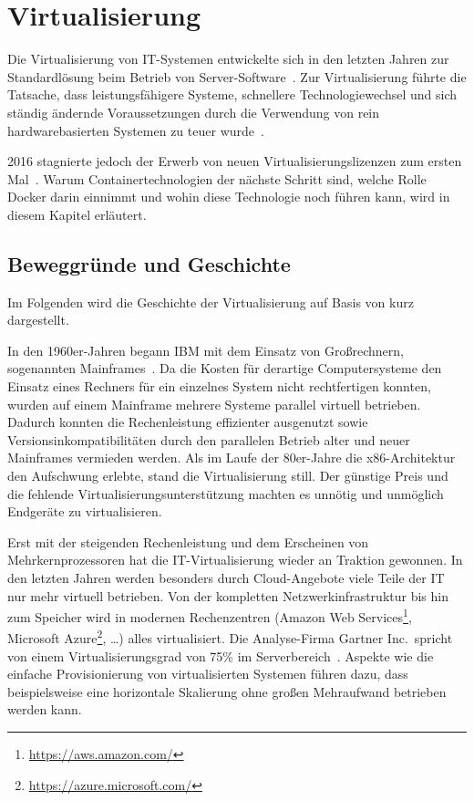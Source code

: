 \chapter{Virtualisierung}
\label{cha:virtualisierung}
Die Virtualisierung von IT-Systemen entwickelte sich in den letzten Jahren zur Standardlösung beim Betrieb von Server-Software~\autocite{Gartner-Magic-Quadrant2016:online}.
Zur Virtualisierung führte die Tatsache, dass leistungsfähigere Systeme, schnellere Technologiewechsel und sich ständig ändernde Voraussetzungen durch die Verwendung von rein hardwarebasierten Systemen zu teuer wurde~\autocite{vmware-virtualization-history:online}.

2016 stagnierte jedoch der Erwerb von neuen Virtualisierungslizenzen zum ersten Mal~\autocite{Gartner-Magic-Quadrant2016:online}.
Warum Containertechnologien der nächste Schritt sind, welche Rolle Docker darin einnimmt und wohin diese Technologie noch führen kann, wird in diesem Kapitel erläutert.
\section{Beweggründe und Geschichte}
\label{sec:virtualisierungsgeschichte}
Im Folgenden wird die Geschichte der Virtualisierung auf Basis von \autocite{Baun2009} kurz dargestellt.

In den 1960er-Jahren begann IBM mit dem Einsatz von Großrechnern, sogenannten Mainframes~\autocite{IBM1981}.
Da die Kosten für derartige Computersysteme den Einsatz eines Rechners für ein einzelnes System nicht rechtfertigen konnten, wurden auf einem Main\-frame mehrere Systeme parallel virtuell betrieben.
Dadurch konnten die Rechenleistung effizienter ausgenutzt sowie Versionsinkompatibilitäten durch den parallelen Betrieb alter und neuer Main\-frames vermieden werden.
Als im Laufe der 80er-Jahre die x86-Architektur den Aufschwung erlebte, stand die Virtualisierung still.
Der günstige Preis und die fehlende Virtualisierungsunterstützung machten es unnötig und unmöglich Endgeräte zu virtualisieren.

Erst mit der steigenden Rechenleistung und dem Erscheinen von Mehrkernprozessoren hat die IT-Virtualisierung wieder an Traktion gewonnen.
In den letzten Jahren werden besonders durch Cloud-Angebote viele Teile der IT nur mehr virtuell betrieben.
Von der  kompletten Netzwerkinfrastruktur bis hin zum Speicher wird in modernen Rechenzentren (Amazon Web Services\footnote{\url{https://aws.amazon.com/}}, Microsoft Azure\footnote{\url{https://azure.microsoft.com/}}, \dots) alles virtualisiert.
Die Analyse-Firma Gartner Inc.\ spricht von einem Virtualisierungsgrad von 75\% im Serverbereich~\autocite{Gartner-Server-Virtualization:online}.
Aspekte wie die einfache Provisionierung von virtualisierten Systemen führen dazu, dass beispielsweise eine horizontale Skalierung ohne großen Mehraufwand betrieben werden kann.

